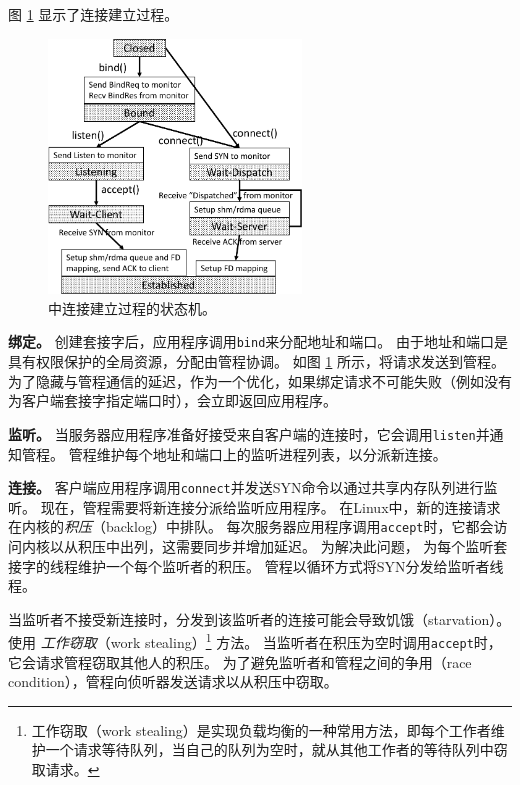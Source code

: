 图 \ref {socksdirect:fig:conn-setup} 显示了连接建立过程。


\begin{figure}[htbp]
	\centering
	\includegraphics[width=0.6\textwidth]{images/conn-setup-new}
	\caption{\libipc{} 中连接建立过程的状态机。}
	\label{socksdirect:fig:conn-setup}
\end{figure}



\textbf{绑定。}
创建套接字后，应用程序调用\texttt {bind}来分配地址和端口。
由于地址和端口是具有权限保护的全局资源，分配由管程协调。
如图 \ref {socksdirect:fig:conn-setup} 所示，\libipc {}将请求发送到管程。
为了隐藏与管程通信的延迟，作为一个优化，如果绑定请求不可能失败（例如没有为客户端套接字指定端口时），\libipc {}会立即返回应用程序。

\textbf{监听。}
当服务器应用程序准备好接受来自客户端的连接时，它会调用\texttt {listen}并通知管程。
管程维护每个地址和端口上的监听进程列表，以分派新连接。


\textbf{连接。}
客户端应用程序调用\texttt {connect}并发送SYN命令以通过共享内存队列进行监听。
现在，管程需要将新连接分派给监听应用程序。
在Linux中，新的连接请求在内核的\emph {积压}（backlog）中排队。
每次服务器应用程序调用\texttt {accept}时，它都会访问内核以从积压中出列，这需要同步并增加延迟。
为解决此问题，\sys{} 为每个监听套接字的线程维护一个每个监听者的积压。
管程以循环方式将SYN分发给监听者线程。

当监听者不接受新连接时，分发到该监听者的连接可能会导致饥饿（starvation）。
\sys{} 使用 \emph {工作窃取}（work stealing）\footnote{工作窃取（work stealing）是实现负载均衡的一种常用方法，即每个工作者维护一个请求等待队列，当自己的队列为空时，就从其他工作者的等待队列中窃取请求。} 方法。
当监听者在积压为空时调用\texttt {accept}时，它会请求管程窃取其他人的积压。
为了避免监听者和管程之间的争用（race condition），管程向侦听器发送请求以从积压中窃取。

